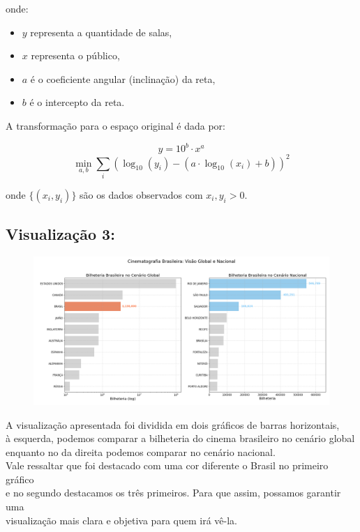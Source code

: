 \documentclass{article}
\begin{document}
onde:
\begin{itemize}
    \item \(y\) representa a quantidade de salas,
    \item \(x\) representa o público,
    \item \(a\) é o coeficiente angular (inclinação) da reta,
    \item \(b\) é o intercepto da reta.
\end{itemize}

\bigskip

A transformação para o espaço original é dada por:

\[
y = 10^{b} \cdot x^{a}
\]
\[
\min_{a,b} \sum_{i} \left( \log_{10}(y_i) - \left(a \cdot \log_{10}(x_i) + b \right) \right)^2
\]

onde \(\{(x_i, y_i)\}\) são os dados observados com \(x_i, y_i > 0\).

\subsection*{Visualização 3:}
\begin{figure}[H]
    \centerline{\includegraphics[width = \linewidth]{img/Figure_3.png}}
\end{figure}

A visualização apresentada foi dividida em dois gráficos de barras horizontais,\\
à esquerda, podemos comparar a bilheteria do cinema brasileiro no cenário global\\
enquanto no da direita podemos comparar no cenário nacional.\\
 Vale ressaltar que foi destacado com uma cor diferente o Brasil no primeiro gráfico\\
e no segundo destacamos os três primeiros. Para que assim, possamos garantir uma\\
visualização mais clara e objetiva para quem irá vê-la.\\
\end{document}
